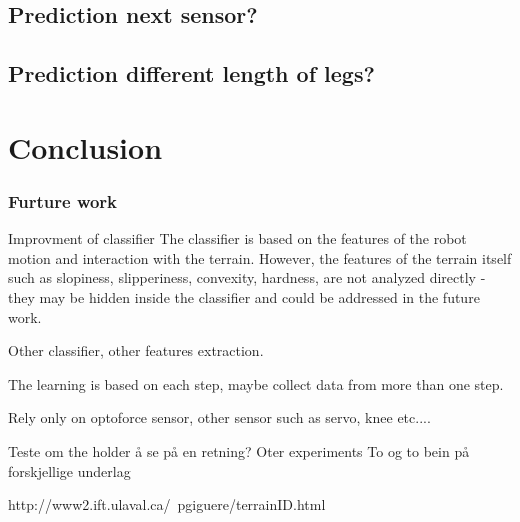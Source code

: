 \documentclass[USenglish]{ifimaster}  %
\begin{document}
\section{Prediction next sensor?}


\section{Prediction different length of legs?}

\chapter{Conclusion}



\subsection{Furture work}
Improvment of classifier
The classifier is based on the features of the robot motion and interaction with the terrain. However, the features of the terrain itself such as slopiness, slipperiness, convexity, hardness, are not analyzed directly - they may be hidden inside the classifier and could be addressed in the future work.

Other classifier, other features extraction.

The learning is based on each step, maybe collect data from more than one step.

Rely only on optoforce sensor, other sensor such as servo, knee etc....

Teste om the holder å se på en retning?
Oter experiments
To og to bein på forskjellige underlag

http://www2.ift.ulaval.ca/~pgiguere/terrainID.html



\backmatter{}


\end{document}
